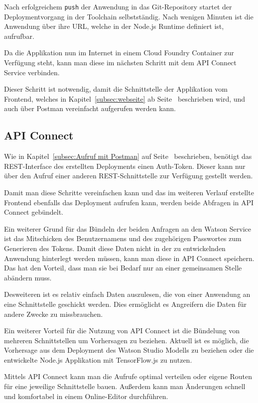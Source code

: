 Nach erfolgreichem \texttt{push} der Anwendung in das Git-Repository startet der Deploymentvorgang in der Toolchain
selbstständig. Nach wenigen Minuten ist die Anwendung über ihre URL, welche in der Node.js Runtime definiert ist,
aufrufbar.

Da die Applikation nun im Internet in einem Cloud Foundry Container zur Verfügung steht, kann man diese im nächsten
Schritt mit dem API Connect Service verbinden.

Dieser Schritt ist notwendig, damit die Schnittstelle der Applikation vom Frontend, welches in
Kapitel~\ref{subsec:webseite} ab Seite~\pageref{subsec:webseite} beschrieben wird, und auch über Postman vereinfacht
aufgerufen werden kann.

\subsection{API Connect}
\label{subsec:apiconnect}
Wie in Kapitel~\ref{subsec:Aufruf mit Postman} auf Seite~\pageref{subsec:Aufruf mit Postman} beschrieben, benötigt das
REST-Interface des erstellten Deployments einen Auth-Token. Dieser kann nur über den Aufruf einer anderen
REST-Schnittstelle zur Verfügung gestellt werden.

Damit man diese Schritte vereinfachen kann und das im weiteren Verlauf erstellte Frontend ebenfalls das Deployment
aufrufen kann, werden beide Abfragen in API Connect gebündelt.

Ein weiterer Grund für das Bündeln der beiden Anfragen an den Watson Service ist das Mitschicken des Benutzernamens und
des zugehörigen Passwortes zum Generieren des Tokens. Damit diese Daten nicht in der zu entwickelnden Anwendung
hinterlegt werden müssen, kann man diese in API Connect speichern. Das hat den Vorteil, dass man sie bei Bedarf nur an
einer gemeinsamen Stelle abändern muss.

Desweiteren ist es relativ einfach Daten auszulesen, die von einer Anwendung an eine Schnittstelle geschickt werden.
Dies ermöglicht es Angreifern die Daten für andere Zwecke zu missbrauchen.

Ein weiterer Vorteil für die Nutzung von API Connect ist die Bündelung von mehreren Schnittstellen um Vorhersagen zu
beziehen. Aktuell ist es möglich, die Vorhersage aus dem Deployment des Watson Studio Modells zu beziehen oder die
entwickelte Node.js Applikation mit TensorFlow.js zu nutzen.

Mittels API Connect kann man die Aufrufe optimal verteilen oder eigene Routen für eine jeweilige Schnittstelle bauen.
Außerdem kann man Änderungen schnell und komfortabel in einem Online-Editor durchführen.

